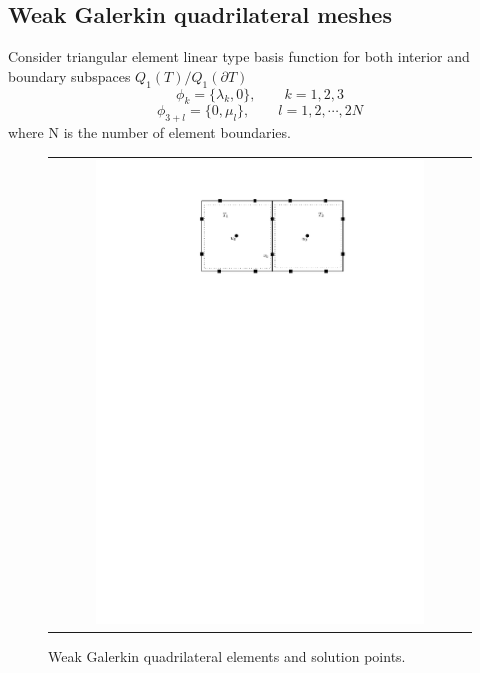 \subsection{Weak Galerkin quadrilateral meshes}

Consider triangular element linear type basis function for both interior and boundary subspaces $ Q_{1}(T) / Q_{1} (\partial T) $
\begin{equation}
\phi_{k} = \{ \lambda_{k}, 0 \}, \qquad k = 1,2, 3
\end{equation}
\begin{equation}
\phi_{3 + l} = \{ 0, \mu_{l} \}, \qquad l = 1, 2, \cdots , 2N
\end{equation}
where N is the number of element boundaries.
\begin{figure}[h]
	\centering
	\begin{tabular}{c}
		\includegraphics[width=0.8\textwidth]{./pics/quad.pdf}
	\end{tabular}
	\caption{\footnotesize Weak Galerkin quadrilateral elements and solution points.}\label{fig2: quad}
\end{figure}

